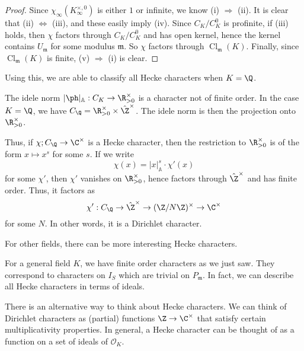 \documentclass[a4paper]{article}
\newcommand\A{\mathbb{A}}
\DeclareMathOperator\Cl{\mathrm{Cl}}
\begin{document}
\begin{proof}
  Since $\chi_\infty(K_\infty^{\times, 0})$ is either $1$ or infinite, we know (i) $\Rightarrow$ (ii). It is clear that (ii) $\Leftrightarrow$ (iii), and these easily imply (iv). Since $C_K/C_K^0$ is profinite, if (iii) holds, then $\chi$ factors through $C_K/C_K^0$ and has open kernel, hence the kernel contains $U_\mathfrak{m}$ for some modulus $\mathfrak{m}$. So $\chi$ factors through $\Cl_{\mathfrak{m}}(K)$. Finally, since $\Cl_{\mathfrak{m}}(K)$ is finite, (v) $\Rightarrow$ (i) is clear.
\end{proof}

Using this, we are able to classify all Hecke characters when $K = \Q$.
\begin{eg}
  The idele norm $|\ph|_{\A}: C_K \to \R^\times_{>0}$ is a character not of finite order. In the case $K = \Q$, we have $C_\Q = \R_{>0}^\times \times \hat{\Z}^\times$. The idele norm is then the projection onto $\R_{>0}^\times$.

  Thus, if $\chi; C_\Q \to \C^\times$ is a Hecke character, then the restriction  to $\R_{>0}^\times$ is of the form $x \mapsto x^{s}$ for some $s$. If we write
  \[
    \chi(x) = |x|_{\A}^s \cdot \chi'(x)
  \]
  for some $\chi'$, then $\chi'$ vanishes on $\R_{>0}^\times$, hence factors through $\hat{\Z}^\times$ and has finite order. Thus, it factors as
  \[
    \chi': C_\Q \to \hat{\Z}^\times \to (\Z/N\Z)^\times \to \C^\times
  \]
  for some $N$. In other words, it is a Dirichlet character.
\end{eg}
For other fields, there can be more interesting Hecke characters.

For a general field $K$, we have finite order characters as we just saw. They correspond to characters on $I_S$ which are trivial on $P_\mathfrak{m}$. In fact, we can describe all Hecke characters in terms of ideals.

There is an alternative way to think about Hecke characters. We can think of Dirichlet characters as (partial) functions $\Z \to \C^\times$ that satisfy certain multiplicativity properties. In general, a Hecke character can be thought of as a function on a set of ideals of $\mathcal{O}_K$.
\end{document}
